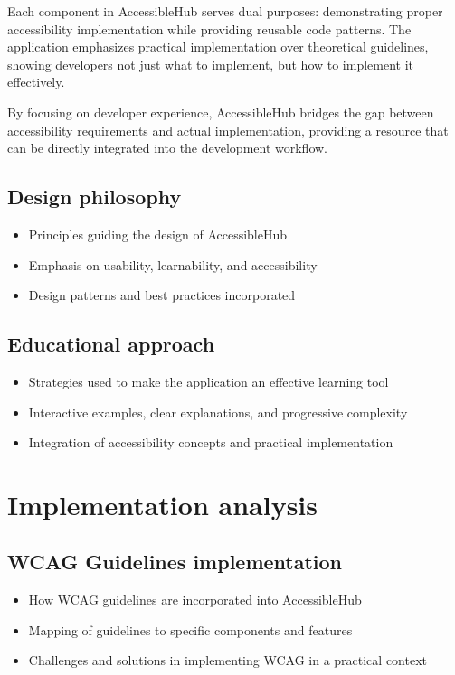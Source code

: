 Each component in AccessibleHub serves dual purposes: demonstrating proper accessibility implementation while providing reusable code patterns. The application emphasizes practical implementation over theoretical guidelines, showing developers not just what to implement, but how to implement it effectively.

By focusing on developer experience, AccessibleHub bridges the gap between accessibility requirements and actual implementation, providing a resource that can be directly integrated into the development workflow.

\subsection{Design philosophy}

\begin{itemize}
\item Principles guiding the design of AccessibleHub
\item Emphasis on usability, learnability, and accessibility
\item Design patterns and best practices incorporated
\end{itemize}

\subsection{Educational approach}

\begin{itemize}
\item Strategies used to make the application an effective learning tool
\item Interactive examples, clear explanations, and progressive complexity
\item Integration of accessibility concepts and practical implementation
\end{itemize}

\section{Implementation analysis}

\subsection{WCAG Guidelines implementation}

\begin{itemize}
\item How WCAG guidelines are incorporated into AccessibleHub
\item Mapping of guidelines to specific components and features
\item Challenges and solutions in implementing WCAG in a practical context
\end{itemize}

